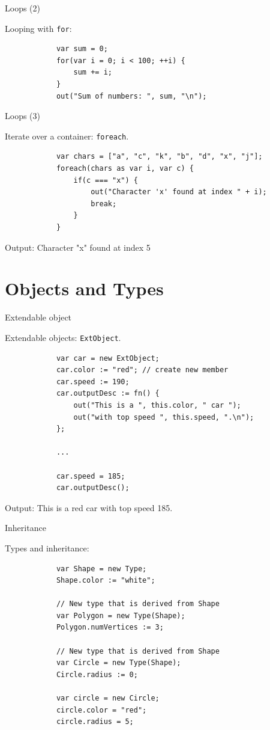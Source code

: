 \documentclass[ucs,9pt]{beamer}
\begin{document}
\begin{frame}[fragile]{Loops (2)}
	\begin{block}{Looping with \lstinline!for!:}
		\begin{lstlisting}
			var sum = 0;
			for(var i = 0; i < 100; ++i) {
			    sum += i;
			}
			out("Sum of numbers: ", sum, "\n");
		\end{lstlisting}
	\end{block}
\end{frame}

\begin{frame}[fragile]{Loops (3)}
	\begin{block}{Iterate over a container: \lstinline!foreach!.}
		\begin{lstlisting}
			var chars = ["a", "c", "k", "b", "d", "x", "j"];
			foreach(chars as var i, var c) {
			    if(c === "x") {
			        out("Character 'x' found at index " + i);
			        break;
			    }
			}
		\end{lstlisting}
	\end{block}
	Output: Character "x" found at index 5
\end{frame}

\section{Objects and Types}
\begin{frame}[fragile]{Extendable object}
	\begin{block}{Extendable objects:  \lstinline!ExtObject!.}
		\begin{lstlisting}
			var car = new ExtObject;
			car.color := "red"; // create new member
			car.speed := 190;
			car.outputDesc := fn() {
			    out("This is a ", this.color, " car ");
			    out("with top speed ", this.speed, ".\n");
			};

			...

			car.speed = 185;
			car.outputDesc();
		\end{lstlisting}
	\end{block}
	Output: This is a red car with top speed 185.
\end{frame}

\begin{frame}[fragile]{Inheritance}
	\begin{block}{Types and inheritance:}
		\begin{lstlisting}
			var Shape = new Type;
			Shape.color := "white";

			// New type that is derived from Shape
			var Polygon = new Type(Shape); 
			Polygon.numVertices := 3;

			// New type that is derived from Shape
			var Circle = new Type(Shape); 
			Circle.radius := 0;

			var circle = new Circle;
			circle.color = "red";
			circle.radius = 5;
		\end{lstlisting}
	\end{block}
\end{frame}
 
\end{document}
